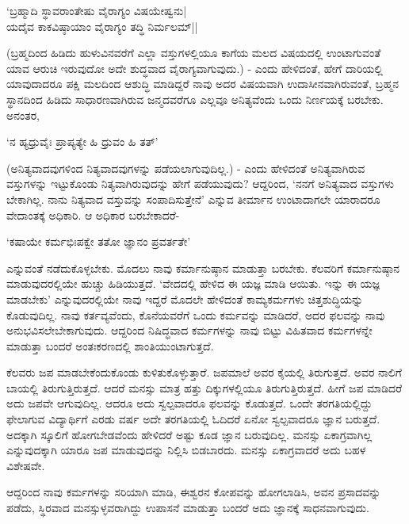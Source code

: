 \begin{shloka}
`ಬ್ರಹ್ಮಾದಿ ಸ್ಥಾವರಾಂತೇಷು ವೈರಾಗ್ಯಂ ವಿಷಯೇಷ್ವನು|\\
ಯದೈವ ಕಾಕವಿಷ್ಠಾಯಾಂ ವೈರಾಗ್ಯಂ ತದ್ಧಿ ನಿರ್ಮಲಮ್||
\end{shloka}

(ಬ್ರಹ್ಮದಿಂದ ಹಿಡಿದು ಹುಳುವಿನವರೆಗೆ ಎಲ್ಲಾ ವಸ್ತುಗಳಲ್ಲಿಯೂ ಕಾಗೆಯ ಮಲದ ವಿಷಯದಲ್ಲಿ ಉಂಟಾಗುವಂತೆ ಯಾವ ಆರುಚಿ ಇರುವುದೋ ಅದೇ ಶುದ್ಧವಾದ ವೈರಾಗ್ಯವಾಗುವುದು.) - ಎಂದು ಹೇಳಿದಂತೆ, ಹೇಗೆ ದಾರಿಯಲ್ಲಿ ಯಾವುದಾದರೂ ಪಕ್ಷಿ ಮಲದಿಂದ ಆಶುದ್ಧಿ ಮಾಡಿದ್ದರೆ ನಾವು ಅದರ ವಿಷಯವಾಗಿ ಉದಾಸೀನವಾಗಿರುವಂತೆ, ಬ್ರಹ್ಮನ ಸ್ಥಾನದಿಂದ ಹಿಡಿದು ಸಾಧಾರಣವಾಗಿರುವ ಜನ್ಮದವರೆಗೂ ಎಲ್ಲವೂ ಅನಿತ್ಯವೆಂದು ಒಂದು ನಿರ್ಣಯಕ್ಕೆ ಬರಬೇಕು. ಅನಂತರ,

\begin{shloka}
`ನ ಹ್ಯಧ್ರುವೈಃ ಪ್ರಾಪ್ಯತ್ಯೇ ಹಿ ಧ್ರುವಂ ಹಿ ತತ್'
\end{shloka}

(ಅನಿತ್ಯವಾದವುಗಳಿಂದ ನಿತ್ಯವಾದವುಗಳನ್ನು ಪಡೆಯಲಾಗುವುದಿಲ್ಲ.) - ಎಂದು ಹೇಳಿದಂತೆ ಅನಿತ್ಯವಾಗಿರುವ ವಸ್ತುಗಳನ್ನು ಇಟ್ಟುಕೊಂಡು ನಿತ್ಯವಾಗಿರುವುದನ್ನು ಹೇಗೆ ಪಡೆಯುವುದು? ಆದ್ದರಿಂದ, `ನನಗೆ ಅನಿತ್ಯವಾದ ವಸ್ತುಗಳು ಬೇಕಾಗಿಲ್ಲ. ನಾನು ನಿತ್ಯವಾದ ವಸ್ತುವನ್ನು ಸಂಪಾದಿಸುತ್ತೇನೆ' ಎನ್ನುವ ತೀರ್ಮಾನ ಉಂಟಾದಾಗಲೇ ಯಾರಾದರೂ ವೇದಾಂತಕ್ಕೆ ಅಧಿಕಾರಿ. ಆ ಅಧಿಕಾರ ಬರಬೇಕಾದರೆ-

\begin{shloka}
`ಕಷಾಯೇ ಕರ್ಮಭಿಃಪಕ್ವೇ ತತೋ ಜ್ಞಾನಂ ಪ್ರವರ್ತತೇ'
\end{shloka}

ಎನ್ನುವಂತೆ ನಡೆದುಕೊಳ್ಳಬೇಕು. ಮೊದಲು ನಾವು ಕರ್ಮಾನುಷ್ಠಾನ ಮಾಡುತ್ತಾ ಬರಬೇಕು. ಕೆಲವರಿಗೆ ಕರ್ಮಾನುಷ್ಠಾನ ಮಾಡುವುದರಲ್ಲಿಯೇ ಹುಚ್ಚು ಹಿಡಿಯುತ್ತದೆ. `ವೇದದಲ್ಲಿ ಹೇಳಿದ ಈ ಯಜ್ಞ ಮಾಡಿ ಆಯಿತು. ಇನ್ನು ಈ ಯಜ್ಞ ಮಾಡಬೇಕು' ಎನ್ನುವುದರಲ್ಲಿಯೇ ನಾವು ಇದ್ದರೆ ಮೊದಲೇ ಹೇಳಿದಂತೆ ಕಾಮ್ಯಕರ್ಮಗಳು ಚಿತ್ತಶುದ್ಧಿಯನ್ನು ಕೊಡುವುದಿಲ್ಲ. ನಾವು ಕರ್ತವ್ಯವೆಂದು, ಕೊನೆಯವರೆಗೆ ಒಂದು ಕರ್ಮವನ್ನು ಮಾಡಿದರೆ, ಅದರ ಫಲವನ್ನು ನಾವು ಅನುಭವಿಸಲೇಬೇಕಾಗುವುದು. ಆದ್ದರಿಂದ ನಿಷಿದ್ಧವಾದ ಕರ್ಮಗಳನ್ನು ನಾವು ಬಿಟ್ಟು ವಿಹಿತವಾದ ಕರ್ಮಗಳನ್ನೇ ಮಾಡುತ್ತಾ ಬಂದರೆ ಅಂತಃಕರಣದಲ್ಲಿ ಶಾಂತಿಯುಂಟಾಗುತ್ತದೆ.

ಕೆಲವರು ಜಪ ಮಾಡಬೇಕೆಂದುಕೊಂಡು ಕುಳಿತುಕೊಳ್ಳುತ್ತಾರೆ. ಜಪಮಾಲೆ ಅವರ ಕೈಯಲ್ಲಿ ತಿರುಗುತ್ತದೆ. ಅವರ ನಾಲಿಗೆ ಬಾಯಲ್ಲಿ ತಿರುಗುತ್ತಿರುತ್ತದೆ. ಆದರೆ ಮನಸ್ಸು ಮಾತ್ರ ಹತ್ತು ದಿಕ್ಕುಗಳಲ್ಲಿಯೂ ತಿರುಗುತ್ತಿರುತ್ತದೆ. ಹೀಗೆ ಜಪ ಮಾಡಿದರೆ ಅದು ಜಪವೇ ಆಗುವುದಿಲ್ಲ. ಆದರೂ ಅದು ಸ್ವಲ್ಪವಾದರೂ ಫಲವನ್ನು ಕೊಡುತ್ತದೆ. ಒಂದೇ ತರಗತಿಯಲ್ಲಿದ್ದು ಫೇಲಾಗುವ ವಿದ್ಯಾರ್ಥಿಗೆ ಎರಡು ವರ್ಷ ಅದೇ ತರಗತಿಯಲ್ಲಿ ಓದಿದರೆ ಏನೋ ಸ್ವಲ್ಪವಾದರೂ ಜ್ಞಾನ ಬರುತ್ತದೆ. ಅದಕ್ಕಾಗಿ ಸ್ಕೂಲಿಗೆ ಹೋಗಬೇಡವೆಂದು ಹೇಳಿದರೆ ಅಷ್ಟು ಕೂಡ ಜ್ಞಾನ ಬರುವುದಿಲ್ಲ. ಮನಸ್ಸು ಏಕಾಗ್ರವಾಗಿಲ್ಲ ಎನ್ನುವುದಕ್ಕಾಗಿ ಯಾರೂ ಜಪ ಮಾಡುವುದನ್ನು ನಿಲ್ಲಿಸಿ ಬಿಡಬಾರದು. ಮನಸ್ಸು ಏಕಾಗ್ರವಾದರೆ ಅದು ಬಹಳ ವಿಶೇಷವೇ.

ಆದ್ದರಿಂದ ನಾವು ಕರ್ಮಗಳನ್ನು ಸರಿಯಾಗಿ ಮಾಡಿ, ಈಶ್ವರನ ಕೋಪವನ್ನು ಹೋಗಲಾಡಿಸಿ, ಅವನ ಪ್ರಸಾದವನ್ನು ಪಡೆದು, ಸ್ಥಿರವಾದ ಮನಸ್ಸುಳ್ಳವರಾಗಿದ್ದು ಉಪಾಸನೆ ಮಾಡುತ್ತಾ ಬಂದರೆ ಅದು ಜ್ಞಾನಕ್ಕೆ ಸಾಧನವಾಗುವುದು.

